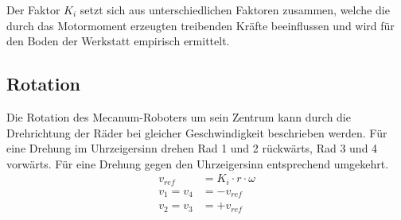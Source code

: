Der Faktor $K_i$ setzt sich aus unterschiedlichen Faktoren zusammen, welche die durch das Motormoment erzeugten treibenden Kräfte beeinflussen und wird für den Boden der Werkstatt empirisch ermittelt.


\subsection{Rotation}
Die Rotation des Mecanum-Roboters um sein Zentrum kann durch die Drehrichtung der Räder bei gleicher Geschwindigkeit beschrieben werden.
Für eine Drehung im Uhrzeigersinn drehen Rad 1 und 2 rückwärts, Rad 3 und 4 vorwärts. Für eine Drehung gegen den Uhrzeigersinn entsprechend umgekehrt.
\begin{align*}
    v_{ref} &= K_i \cdot r \cdot \omega \\
    v_1 = v_4 &= - v_{ref}              \\
    v_2 = v_3 &= + v_{ref}
\end{align*}



